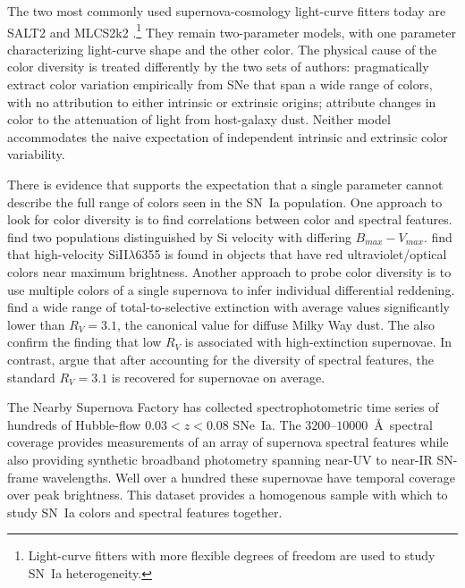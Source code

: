 \documentclass{aastex}   	%
\begin{document}
The two most commonly used supernova-cosmology light-curve fitters today are SALT2 \citep{2007A&A...466...11G} and MLCS2k2
\citep{2007ApJ...659..122J}.\footnote{Light-curve fitters with more flexible degrees of freedom
\citep[e.g.][]{2008ApJ...681..482C, 2011AJ....141...19B} are used to study SN~Ia heterogeneity.}
They remain two-parameter models, with one parameter characterizing light-curve shape and the other
 color.  The physical cause of the color diversity is treated differently by the two sets of authors: 
\citet{2007A&A...466...11G} pragmatically extract color variation empirically from SNe that span a wide range of colors, with no attribution
to either intrinsic or extrinsic origins;
\citet{2007ApJ...659..122J}
attribute changes in color to the attenuation of light from host-galaxy dust. Neither model accommodates the naive expectation of independent
intrinsic and extrinsic color variability.

There is evidence that supports the expectation that a single parameter cannot describe the full range
of colors seen in the SN~Ia population.  One approach to look for color diversity is to find correlations between color and spectral features.
\citet{2009ApJ...699L.139W, 2011ApJ...729...55F} find two populations distinguished
by Si velocity with differing $B_{max}-V_{max}$.
\citet{2015MNRAS.451.1973S}
find that high-velocity SiII$\lambda$6355 is found in objects that have red ultraviolet/optical colors near maximum brightness.
Another approach to probe color diversity is to use multiple colors of a single supernova to infer individual differential reddening. 
\citet{2014ApJ...789...32B, 2015MNRAS.453.3300A} find a wide
range of total-to-selective extinction with average values significantly lower than $R_V = 3.1$,
the canonical value for diffuse Milky Way dust.
The also confirm the \citet{2011ApJ...729...55F} finding that low $R_V$ is associated with high-extinction supernovae.
In contrast, \citet{2011A&A...529L...4C} argue that after accounting for the diversity of spectral features,
the standard $R_V=3.1$ is recovered for supernovae on average.

The Nearby Supernova Factory \citep[SNfactory;][]{2004SPIE.5249..146L} has collected  
spectrophotometric time series of hundreds of Hubble-flow $0.03<z<0.08$ SNe~Ia.   The $3200$--$10000$~\AA\ spectral coverage
provides measurements of an array of supernova spectral features while also providing synthetic broadband photometry
spanning near-UV to near-IR SN-frame wavelengths.  Well over a hundred these supernovae have temporal coverage over
peak brightness.  This dataset provides a homogenous sample with which to study SN~Ia colors and spectral features together.
\end{document}
